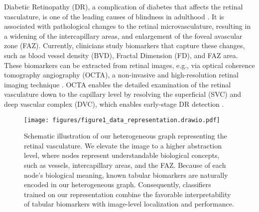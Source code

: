 Diabetic Retinopathy (DR), a complication of diabetes that affects the retinal vasculature, is one of the leading causes of blindness in adulthood \cite{teo2021global}. It is associated with pathological changes to the retinal microvasculature, resulting in a widening of the intercapillary areas, and enlargement of the foveal avascular zone (FAZ). Currently, clinicians study biomarkers that capture these changes, such as blood vessel density (BVD), Fractal Dimension (FD), and FAZ area. 
These biomarkers can be extracted from retinal images, e.g., via optical coherence tomography angiography (OCTA), a non-invasive and high-resolution retinal imaging technique \cite{sun2019oct,le2021machine}. OCTA enables the detailed examination of the retinal vasculature \cite{fayed2024retinal} down to the capillary level by resolving the superficial (SVC) and deep vascular complex (DVC), which enables early-stage DR detection \cite{moore1999three}. 

\begin{figure}[t]
    \centering
    \texttt{[image: figures/figure1\_data\_representation.drawio.pdf]}
    \caption{Schematic illustration of our heterogeneous graph representing the retinal vasculature. We elevate the image to a higher abstraction level, where nodes represent understandable biological concepts, such as vessels, intercapillary areas, and the FAZ. Because of each node's biological meaning, known tabular biomarkers are naturally encoded in our heterogeneous graph. Consequently, classifiers trained on our representation combine the favorable interpretability of tabular biomarkers with image-level localization and performance.}
    \vspace{-0.5cm}
    \label{fig:abstraction}
\end{figure}

